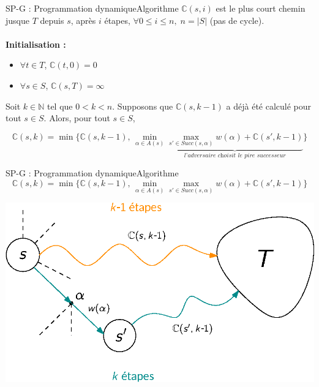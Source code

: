 \documentclass[compress]{beamer}
\begin{document}
\begin{frame}{SP-G : Programmation dynamique}{Algorithme}
    $\mathbb{C}(s, i)$ est le plus court chemin jusque $T$ depuis $s$, après $i$ étapes, $\forall 0 \leq i \leq n, \; n = |S|$ (pas de cycle).%
    \\ $ $ \vspace{-0.03\linewidth}\\
      \textbf{\color{fibeamer@orange}Initialisation : }
      \begin{itemize}
        \item $\forall t \in T$, $\mathbb{C}(t, 0) = 0$
        \item $\forall s \in S$, $\mathbb{C}(s, T) = \infty$
      \end{itemize}
      Soit $k \in \mathbb{N}$ tel que $0 < k < n$. Supposons que $\mathbb{C}(s, k-1)$ a déjà été calculé pour tout $s \in S$.
        Alors, pour tout $s \in S$,

  \[
    \mathbb{C}(s, k) =
    \min \{
      \mathbb{C}(s, k-1), \,
        \min_{\alpha \in A(s)} \underbrace{\max_{s'\in Succ(s, \alpha)} w(\alpha) + \mathbb{C}(s', k-1)}_{\textit{l'adversaire choisit le pire successeur}}
    \}
  \]
\end{frame}

\begin{frame}{SP-G : Programmation dynamique}{Algorithme}
  \[
    \mathbb{C}(s, k) =
    \min \{
      \mathbb{C}(s, k-1), \,
        \min_{\alpha \in A(s)} \max_{s'\in Succ(s, \alpha)} w(\alpha) + \mathbb{C}(s', k-1)
    \}
  \]
  \begin{center}
    \includegraphics[width=0.6\linewidth]{resources/sp-g}
  \end{center}
\end{frame}
\end{document}
